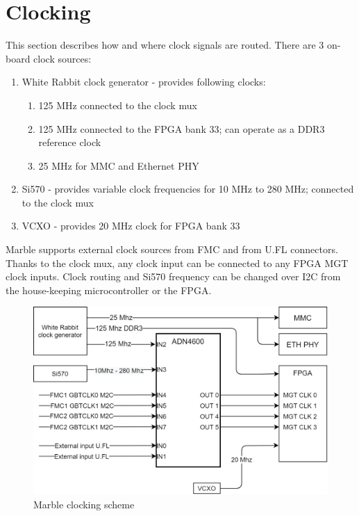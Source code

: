 \documentclass[12pt,oneside,a4]{article}
\begin{document}
\section{Clocking}
This section describes how and where clock signals are routed. There are 3 on-board clock sources:
\begin{enumerate}
	\item White Rabbit clock generator - provides following clocks:
		\begin{enumerate}
			\item 125 MHz connected to the clock mux
			\item 125 MHz connected to the FPGA bank 33; can operate as a DDR3 reference clock
			\item 25 MHz for MMC and Ethernet PHY
		\end{enumerate}
	\item Si570 - provides variable clock frequencies for 10 MHz to 280 MHz; connected to the clock mux
	\item VCXO - provides 20 MHz clock for FPGA bank 33
\end{enumerate}
Marble supports external clock sources from FMC and from U.FL connectors. Thanks to the clock mux, any clock input can be connected to any FPGA MGT clock inputs. Clock routing and Si570 frequency can be changed over I2C from the house-keeping microcontroller or the FPGA.

\begin{figure}[H]
\begin{center}
\includegraphics[width=1\linewidth]{clocking.png}
 \caption{Marble clocking scheme}\label{clocking}
\end{center}
\end{figure}
\end{document}
